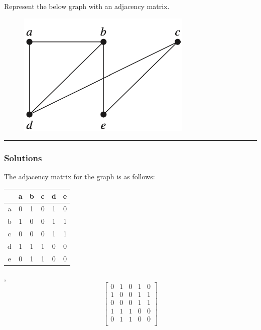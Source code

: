 \newpage
\begin{question}
Represent the below graph with an adjacency matrix.

\begin{figure}[htb!]
  \centering
  \includegraphics[width=0.3\linewidth]{q2_figure.pdf}
\end{figure}

\end{question}

\par\noindent\rule{\textwidth}{0.5pt}

\subsubsection*{Solutions}

The adjacency matrix for the graph is as follows:
\bigskip
\begin{center}
\begin{tabular}{|c|ccccc|}
  \hline
  & a & b & c & d & e \\
  \hline
  a & 0 & 1 & 0 & 1 & 0 \\
  b & 1 & 0 & 0 & 1 & 1 \\
  c & 0 & 0 & 0 & 1 & 1 \\
  d & 1 & 1 & 1 & 0 & 0 \\
  e & 0 & 1 & 1 & 0 & 0 \\
  \hline
\end{tabular}
\end{center}
,
$$
\begin{bmatrix}
  0 & 1 & 0 & 1 & 0 \\
  1 & 0 & 0 & 1 & 1 \\
  0 & 0 & 0 & 1 & 1 \\
  1 & 1 & 1 & 0 & 0 \\
  0 & 1 & 1 & 0 & 0 \\
\end{bmatrix}
$$

